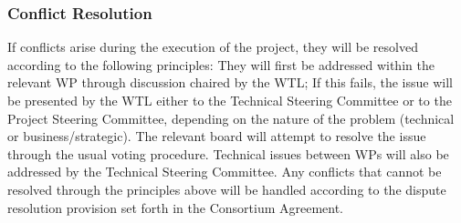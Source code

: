 \documentclass[a4paper,11pt]{article}
\begin{document}
\subsubsection*{Conflict Resolution}
\label{conflict-resolution}
If conflicts arise during the execution of the project, they will be resolved according to the following principles:
% 
They will first be addressed within the relevant WP through discussion chaired by the WTL;
If this fails, the issue will be presented by the WTL either to the Technical Steering Committee
or to the Project Steering Committee, depending on the nature of the problem (technical or business/strategic).
The relevant board will attempt to resolve the issue through the usual voting procedure.
%
Technical issues between WPs will also be addressed by the Technical Steering Committee.
Any conflicts that cannot be resolved through the principles above will
be handled according to the dispute resolution provision set forth in the
Consortium Agreement.


\end{document}
